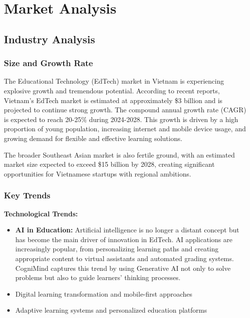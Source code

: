 \section{Market Analysis}

\subsection{Industry Analysis}
\subsubsection{Size and Growth Rate}
The Educational Technology (EdTech) market in Vietnam is experiencing explosive growth and tremendous potential.
According to recent reports, Vietnam's EdTech market is estimated at approximately \$3 billion and is projected to 
continue strong growth. The compound annual growth rate (CAGR) is expected to reach 20-25\% during 2024-2028. This 
growth is driven by a high proportion of young population, increasing internet and mobile device usage, and growing 
demand for flexible and effective learning solutions.

The broader Southeast Asian market is also fertile ground, with an estimated market size expected to exceed \$15 billion
by 2028, creating significant opportunities for Vietnamese startups with regional ambitions.

\subsubsection{Key Trends}
\textbf{Technological Trends:}
\begin{itemize}
    \item \textbf{AI in Education:}
        Artificial intelligence is no longer a distant concept but has become the main driver of innovation in EdTech.
        AI applications are increasingly popular, from personalizing learning paths and creating appropriate content to
        virtual assistants and automated grading systems. CogniMind captures this trend by using Generative AI not only
        to solve problems but also to guide learners' thinking processes.
    \item 
        Digital learning transformation and mobile-first approaches
    \item
        Adaptive learning systems and personalized education platforms
\end{itemize}

